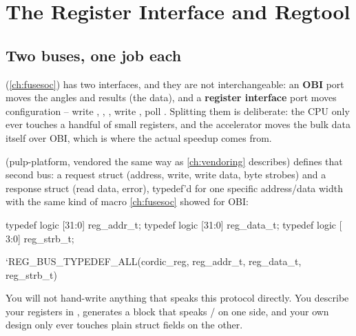 \chapter{The Register Interface and Regtool}
\label{ch:regtool}


\section{Two buses, one job each}

 (\cref{ch:fusesoc}) has two interfaces, and they are
not interchangeable: an \textbf{OBI} port moves the angles and results (the
data), and a \textbf{register interface} port moves configuration -- write
, , , write , poll
. Splitting them is deliberate: the CPU only ever touches
a handful of small registers, and the accelerator moves the bulk data
itself over OBI, which is where the actual speedup comes from.

 (pulp-platform, vendored the same way as
\cref{ch:vendoring} describes) defines that second bus: a request struct
(address, write, write data, byte strobes) and a response struct (read
data, error), typedef'd for one specific address/data width with the same
kind of macro \cref{ch:fusesoc} showed for OBI:

\begin{svcode}[caption={rtl/cordic\_accel\_types\_pkg.sv -- the reg bus types}]
typedef logic [31:0] reg_addr_t;
typedef logic [31:0] reg_data_t;
typedef logic [ 3:0] reg_strb_t;

`REG_BUS_TYPEDEF_ALL(cordic_reg, reg_addr_t, reg_data_t, reg_strb_t)
\end{svcode}

\begin{ruleofthumb}
You will not hand-write anything that speaks this protocol directly. You
describe your registers in ,  generates a block
that speaks / on one side, and your own
design only ever touches plain struct fields on the other.
\end{ruleofthumb}

